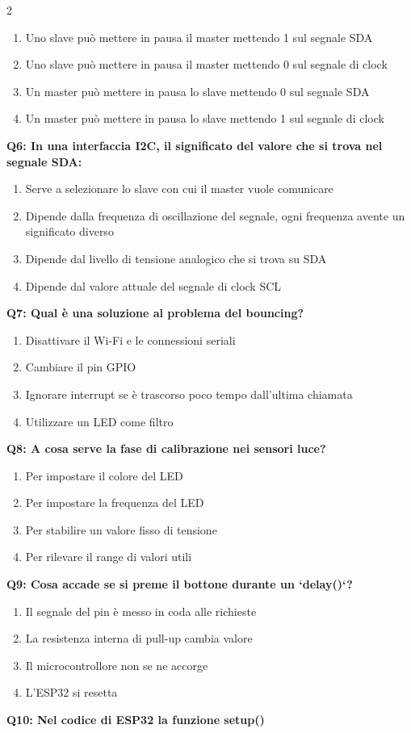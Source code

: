 \documentclass[10pt]{article}
\begin{document}
\begin{multicols}{2}
\begin{enumerate}[label=\arabic*.]
\item Uno slave può mettere in pausa il master mettendo 1 sul segnale SDA
\item Uno slave può mettere in pausa il master mettendo 0 sul segnale di clock
\item Un master può mettere in pausa lo slave mettendo 0 sul segnale SDA
\item Un master può mettere in pausa lo slave mettendo 1 sul segnale di clock
\end{enumerate}
\textbf{Q6: In una interfaccia I2C, il significato del valore che si trova nel segnale SDA:}

\begin{enumerate}[label=\arabic*.]
\item Serve a selezionare lo slave con cui il master vuole comunicare
\item Dipende dalla frequenza di oscillazione del segnale, ogni frequenza avente un significato diverso
\item Dipende dal livello di tensione analogico che si trova su SDA
\item Dipende dal valore attuale del segnale di clock SCL
\end{enumerate}
\textbf{Q7: Qual è una soluzione al problema del bouncing?}

\begin{enumerate}[label=\arabic*.]
\item Disattivare il Wi-Fi e le connessioni seriali
\item Cambiare il pin GPIO
\item Ignorare interrupt se è trascorso poco tempo dall'ultima chiamata
\item Utilizzare un LED come filtro
\end{enumerate}
\textbf{Q8: A cosa serve la fase di calibrazione nei sensori luce?}

\begin{enumerate}[label=\arabic*.]
\item Per impostare il colore del LED
\item Per impostare la frequenza del LED
\item Per stabilire un valore fisso di tensione
\item Per rilevare il range di valori utili
\end{enumerate}
\textbf{Q9: Cosa accade se si preme il bottone durante un `delay()`?}

\begin{enumerate}[label=\arabic*.]
\item Il segnale del pin è messo in coda alle richieste
\item La resistenza interna di pull-up cambia valore
\item Il microcontrollore non se ne accorge
\item L’ESP32 si resetta
\end{enumerate}
\textbf{Q10: Nel codice di ESP32 la funzione setup()}


\end{multicols}
\end{document}
